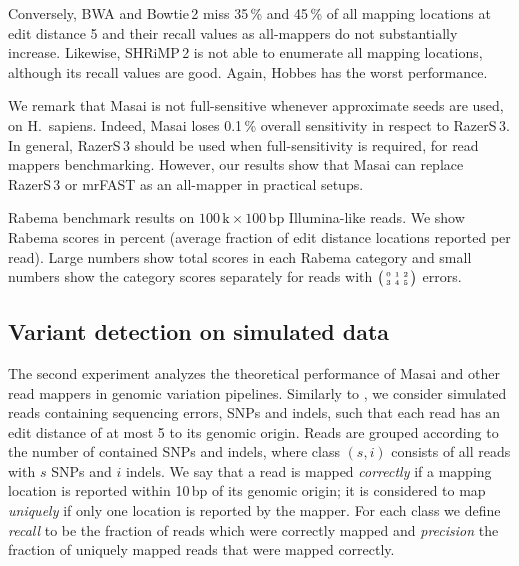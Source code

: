 Conversely, BWA and Bowtie\,2 miss 35\,\% and 45\,\% of all mapping locations at edit distance 5 and their recall values as all-mappers do not substantially increase.
Likewise, SHRiMP\,2 is not able to enumerate all mapping locations, although its recall values are good.
Again, Hobbes has the worst performance.

We remark that Masai is not full-sensitive whenever approximate seeds are used, \eg on H.~sapiens. Indeed, Masai loses 0.1\,\% overall sensitivity in respect to RazerS\,3.
In general, RazerS\,3 should be used when full-sensitivity is required, \ie for read mappers benchmarking. However, our results show that Masai can replace RazerS\,3 or mrFAST as an all-mapper in practical setups.

\begin{table*}[t]
  \caption[Masai results in the Rabema benchmark]
  {
  \label{tab:Rabema}
    Rabema benchmark results on $100\,\text{k}\times 100\,\text{bp}$ Illumina-like reads.
    We show Rabema scores in percent (average fraction of edit distance locations reported per read).
    Large numbers show total scores in each Rabema category and small numbers show the category scores separately for reads with $\bigl(\begin{smallmatrix}\mbox{\tiny 0}&\mbox{\tiny 1}&\mbox{\tiny 2}\\\mbox{\tiny 3}&\mbox{\tiny 4}&\mbox{\tiny 5}\end{smallmatrix}\bigr)$ errors.
    }
  \vspace{-3mm}
  \center
  \sffamily
  \resizebox{0.95\textwidth}{!}
  {
	\renewcommand{\tabcolsep}{0.8ex}
	
  }
\end{table*}

\subsection{Variant detection on simulated data}

The second experiment analyzes the theoretical performance of Masai and other read mappers in genomic variation pipelines.
Similarly to \citep{Shrimp2}, we consider simulated reads containing sequencing errors, SNPs and indels, such that each read has an edit distance of at most 5 to its genomic origin.
Reads are grouped according to the number of contained SNPs and indels, where class $(s,i)$ consists of all reads with $s$ SNPs and $i$ indels.
We say that a read is mapped \emph{correctly} if a mapping location is reported within 10\,bp of its genomic origin;
it is considered to map \emph{uniquely} if only one location is reported by the mapper.
For each class we define \emph{recall} to be the fraction of reads which were correctly mapped and \emph{precision} the fraction of uniquely mapped reads that were mapped correctly.

